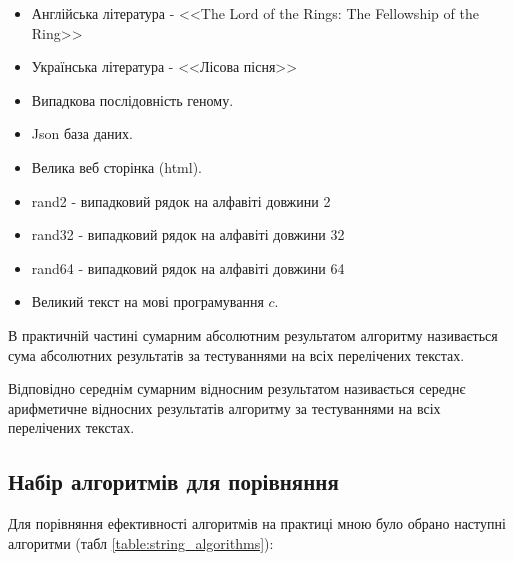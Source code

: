 \documentclass[a4paper,14pt]{extarticle} %
\begin{document}
	\begin{itemize}
		\item Англійська література - <<The Lord of the Rings: The Fellowship of the Ring>>
		\item Українська література - <<Лісова пісня>>
		\item Випадкова послідовність геному.
		\item Json база даних.
		\item Велика веб сторінка (html).
		\item rand2 - випадковий рядок на алфавіті довжини 2
		\item rand32 - випадковий рядок на алфавіті довжини 32
		\item rand64 - випадковий рядок на алфавіті довжини 64
		\item Великий текст на мові програмування $c$.
	\end{itemize}

	В практичній частині сумарним абсолютним результатом алгоритму називається сума абсолютних результатів за тестуваннями на всіх перелічених текстах.

	Відповідно середнім сумарним відносним результатом називається середнє арифметичне відносних результатів алгоритму за тестуваннями на всіх перелічених текстах.
	\subsection{Набір алгоритмів для порівняння} \label{section:algorithms_set}

	Для порівняння ефективності алгоритмів на практиці мною було обрано наступні алгоритми (табл \ref{table:string_algorithms}):
\end{document}
